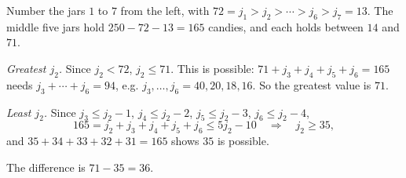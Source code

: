 Number the jars $1$ to $7$ from the left, with $72=j_1>j_2>\cdots>j_6>j_7=13$. The middle five jars hold $250-72-13=165$ candies, and each holds between $14$ and $71$.

\emph{Greatest $j_2$.} Since $j_2<72$, $j_2\le71$. This is possible: $71+j_3+j_4+j_5+j_6=165$ needs $j_3+\cdots+j_6=94$, e.g. $j_3,\dots,j_6=40,20,18,16$. So the greatest value is $71$.

\emph{Least $j_2$.} Since $j_3\le j_2-1$, $j_4\le j_2-2$, $j_5\le j_2-3$, $j_6\le j_2-4$,
\[
165=j_2+j_3+j_4+j_5+j_6\le 5j_2-10\quad\Longrightarrow\quad j_2\ge35 ,
\]
and $35+34+33+32+31=165$ shows $35$ is possible.

The difference is $71-35=\boxed{36}$.
